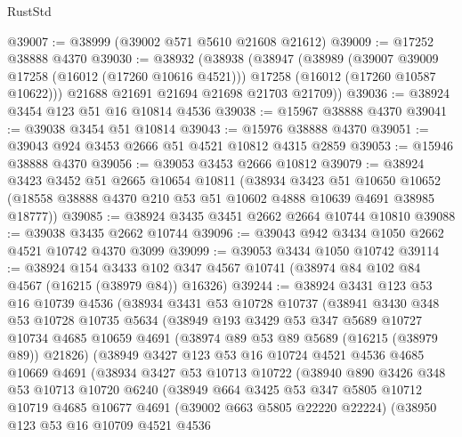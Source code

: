 \begin{lexlean}{RustStd}
\begin{coremodule}
@39007 := @38999 (@39002 @571 @5610 @21608 @21612)
@39009 := @17252 @38888 @4370
@39030 := @38932
    (@38938
      (@38947
        (@38989
          (@39007 @39009 @17258 (@16012 (@17260 @10616 @4521)))
          @17258
          (@16012 (@17260 @10587 @10622)))
        @21688
        @21691
        @21694
        @21698
        @21703
        @21709))
@39036 := @38924 @3454 @123 @51 @16 @10814 @4536
@39038 := @15967 @38888 @4370
@39041 := @39038 @3454 @51 @10814
@39043 := @15976 @38888 @4370
@39051 := @39043 @924 @3453 @2666 @51 @4521 @10812 @4315 @2859
@39053 := @15946 @38888 @4370
@39056 := @39053 @3453 @2666 @10812
@39079 := @38924
    @3423
    @3452
    @51
    @2665
    @10654
    @10811
    (@38934
      @3423
      @51
      @10650
      @10652
      (@18558 @38888 @4370 @210 @53 @51 @10602 @4888 @10639 @4691 @38985 @18777))
@39085 := @38924 @3435 @3451 @2662 @2664 @10744 @10810
@39088 := @39038 @3435 @2662 @10744
@39096 := @39043 @942 @3434 @1050 @2662 @4521 @10742 @4370 @3099
@39099 := @39053 @3434 @1050 @10742
@39114 := @38924
    @154
    @3433
    @102
    @347
    @4567
    @10741
    (@38974 @84 @102 @84 @4567 (@16215 (@38979 @84)) @16326)
@39244 := @38924
    @3431
    @123
    @53
    @16
    @10739
    @4536
    (@38934
      @3431
      @53
      @10728
      @10737
      (@38941
        @3430
        @348
        @53
        @10728
        @10735
        @5634
        (@38949
          @193
          @3429
          @53
          @347
          @5689
          @10727
          @10734
          @4685
          @10659
          @4691
          (@38974 @89 @53 @89 @5689 (@16215 (@38979 @89)) @21826)
          (@38949
            @3427
            @123
            @53
            @16
            @10724
            @4521
            @4536
            @4685
            @10669
            @4691
            (@38934
              @3427
              @53
              @10713
              @10722
              (@38940
                @890
                @3426
                @348
                @53
                @10713
                @10720
                @6240
                (@38949
                  @664
                  @3425
                  @53
                  @347
                  @5805
                  @10712
                  @10719
                  @4685
                  @10677
                  @4691
                  (@39002 @663 @5805 @22220 @22224)
                  (@38950
                    @123
                    @53
                    @16
                    @10709
                    @4521
                    @4536

\end{coremodule}
\end{lexlean}
